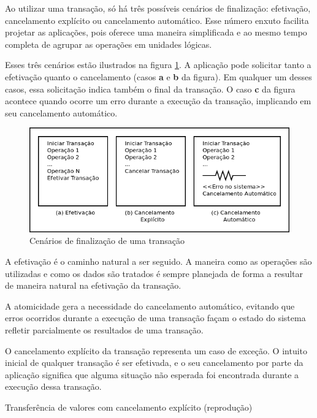 \documentclass[11pt,twoside,a4paper]{book}
\begin{document}
Ao utilizar uma transação, só há três possíveis cenários de finalização: efetivação, cancelamento explícito ou cancelamento automático. Esse número enxuto facilita projetar as aplicações, pois oferece uma maneira simplificada e ao mesmo tempo completa de agrupar as operações em unidades lógicas.

Esses três cenários estão ilustrados na figura \ref{fig:cenarios_finalizacao}. A aplicação pode solicitar tanto a efetivação quanto o cancelamento (casos \textbf{a} e \textbf{b} da figura). Em qualquer um desses casos, essa solicitação indica também o final da transação. O caso \textbf{c} da figura acontece quando ocorre um erro durante a execução da transação, implicando em seu cancelamento automático.

\begin{figure}
  \centering
  \includegraphics[width=\textwidth]{cenarios_finalizacao} 
  \caption{Cenários de finalização de uma transação}
  \label{fig:cenarios_finalizacao} 
\end{figure}

A efetivação é o caminho natural a ser seguido. A maneira como as operações são utilizadas e como os dados são tratados é sempre planejada de forma a resultar de maneira natural na efetivação da transação.

A atomicidade gera a necessidade do cancelamento automático, evitando que erros ocorridos durante a execução de uma transação façam o estado do sistema refletir parcialmente os resultados de uma transação.

O cancelamento explícito da transação representa um caso de exceção. O intuito inicial de qualquer transação é ser efetivada, e o seu cancelamento por parte da aplicação significa que alguma situação não esperada foi encontrada durante a execução dessa transação.

\begin{algorithm}
\caption{Transferência de valores com cancelamento explícito (reprodução)}
\label{alg:transferencia_transacao_3}
\end{algorithm}
\end{document}

